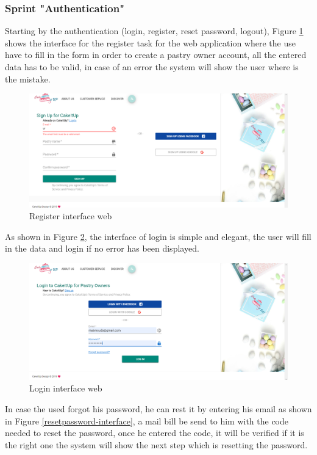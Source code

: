 \documentclass[12pt,a4paper]{report}
\begin{document}
\subsubsection*{Sprint "Authentication"}
Starting by the authentication (login, register, reset password, logout), Figure \ref{register-interface} shows the interface for the register task for the web application where the use have to fill in the form in order to create a pastry owner account, all the entered data has to be valid, in case of an error the system will show the user where is the mistake.
\begin{figure}[H]
	\vspace*{2cm}
	\centering
	\includegraphics[width=7in,keepaspectratio]{register.png}
	\caption{Register interface web}
	\label{register-interface}
\end{figure}
\clearpage
As shown in Figure \ref{login-interface}, the interface of login is simple and elegant, the user will fill in the data and login if no error has been displayed.
\begin{figure}[H]
	\centering
	\includegraphics[width=6.5in,keepaspectratio]{login.png}
	\caption{Login interface web}
	\label{login-interface}
\end{figure}
In case the used forgot his password, he can rest it by entering his email as shown in Figure \ref{resetpassword-interface}, a mail bill be send to him with the code needed to reset the password, once he entered the code, it will be verified if it is the right one the system will show the next step which is resetting the password.
\end{document}
